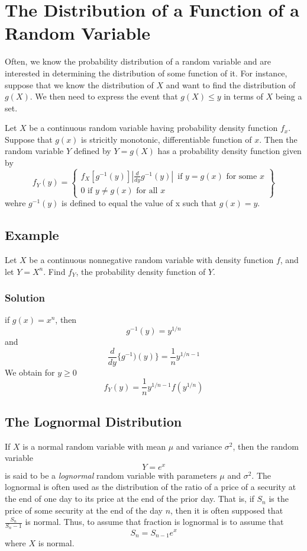 \section{The Distribution of a Function of a Random Variable}
Often, we know the probability distribution of a random variable and are interested in determining the distribution of some function of it. For instance, suppose that we know the distribution of $X$ and want to find the distribution of $g(X)$. We then need to express the event that $g(X)\leq y$ in terms of $X$ being a set. 
\begin{theorem}
    Let $X$ be a continuous random variable having probability density function $f_x$. Suppose that $g(x)$ is stricitly monotonic, differentiable function of $x$. Then the random variable $Y$ defined by $Y = g(X)$ has a probability density function given by 
    \begin{equation*}
        f_Y(y) =
        \left\{
            \begin{array}{lr}
                f_X[g^{-1}(y)]\left|\frac{d}{dy}g^{-1}(y)\right| \, \text{ if } y = g(x) \text{ for some } x\\
                0 \text{ if } y\neq g(x) \text{ for all } x
            \end{array}
        \right\}
    \end{equation*}
    wehre $g^{-1}(y)$ is defined to equal the value of x such that $g(x) = y$.
\end{theorem}
\subsection*{Example}
Let $X$ be a continuous nonnegative random variable with density function $f$, and let $Y = X^n$. Find $f_Y$, the probability density function of $Y$.
\subsubsection*{Solution}
if $g(x) = x^n$, then \[g^{-1}(y) = y^{1/n}\] and \[\frac{d}{dy}\{g^{-1})(y)\} = \frac{1}{n}y^{1/n-1}\]
We obtain for $y\geq 0$ \[f_Y(y) = \frac{1}{n}y^{1/n-1}f(y^{1/n})\]
\subsection*{The Lognormal Distribution}
If $X$ is a normal random variable with mean $\mu$ and variance $\sigma^2$, then the random variable \[Y = e^x\] is said to be a \textit{lognormal} random variable with parameters $\mu$ and $\sigma^2$. The lognormal is often used as the distribution of the ratio of a price of a security at the end of one day to its price at the end of the prior day.  That is, if $S_n$ is the price of some security at the end of the day $n$, then it is often supposed that $\frac{S_n}{S_n - 1}$ is normal. Thus, to assume that fraction is lognormal is to assume that \[S_n = S_{n-1}e^x\] where $X$ is normal. 